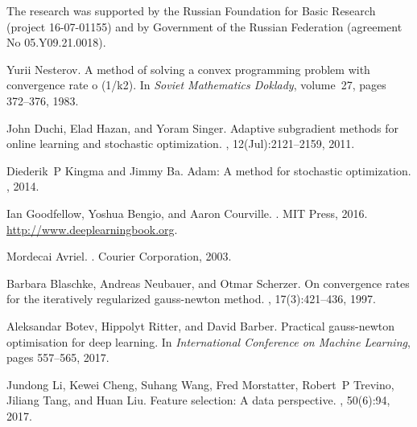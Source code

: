 \documentclass[
11pt,%
tightenlines,%
twoside,%
onecolumn,%
nofloats,%
nobibnotes,%
nofootinbib,%
superscriptaddress,%
noshowpacs,%
centertags]%
{revtex4}
\begin{document}
\begin{acknowledgments}

The research was supported by the Russian Foundation for Basic Research (project 16-07-01155) and by Government of the Russian Federation (agreement No 05.Y09.21.0018).

\end{acknowledgments}


\begin{thebibliography}{10}
	
	Yurii Nesterov.
	\newblock A method of solving a convex programming problem with convergence
	rate o (1/k2).
	\newblock In {\em Soviet Mathematics Doklady}, volume~27, pages 372--376, 1983.
	
	John Duchi, Elad Hazan, and Yoram Singer.
	\newblock Adaptive subgradient methods for online learning and stochastic
	optimization.
	, 12(Jul):2121--2159, 2011.
	
	Diederik~P Kingma and Jimmy Ba.
	\newblock Adam: A method for stochastic optimization.
	, 2014.
	
	Ian Goodfellow, Yoshua Bengio, and Aaron Courville.
	.
	\newblock MIT Press, 2016.
	\newblock \url{http://www.deeplearningbook.org}.
	
	Mordecai Avriel.
	.
	\newblock Courier Corporation, 2003.
	
	Barbara Blaschke, Andreas Neubauer, and Otmar Scherzer.
	\newblock On convergence rates for the iteratively regularized gauss-newton
	method.
	, 17(3):421--436, 1997.
	
	Aleksandar Botev, Hippolyt Ritter, and David Barber.
	\newblock Practical gauss-newton optimisation for deep learning.
	\newblock In {\em International Conference on Machine Learning}, pages
	557--565, 2017.
	
	Jundong Li, Kewei Cheng, Suhang Wang, Fred Morstatter, Robert~P Trevino,
	Jiliang Tang, and Huan Liu.
	\newblock Feature selection: A data perspective.
	, 50(6):94, 2017.
	

\end{thebibliography}
\end{document}
